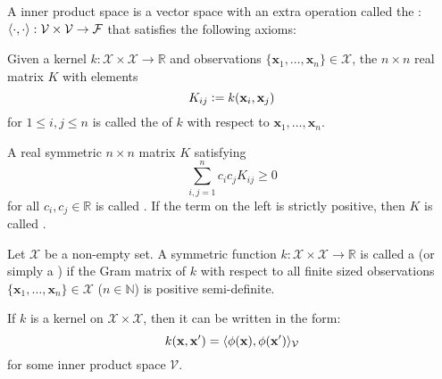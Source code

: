 \begin{definition}
A inner product space is a vector space with an extra operation called the : $\langle\cdot, \cdot\rangle : \mathcal{V} \times \mathcal{V} \to \mathcal{F}$ that satisfies the following axioms:
\end{definition}

\begin{definition}
Given a kernel $k : \mathcal{X} \times \mathcal{X} \to \mathbb{R}$ and observations $\{ \mathbf{x}_1, \dotsc, \mathbf{x}_n \} \in \mathcal{X}$, the $n \times n$ real matrix $K$ with elements
\begin{equation}
	K_{ij} \vcentcolon= k(\mathbf{x}_i, \mathbf{x}_j)
\end{equation}
for $1 \leq i, j \leq n$ is called the  of $k$ with respect to $\mathbf{x}_1, \dotsc, \mathbf{x}_n$.
\end{definition}

\begin{definition}
A real symmetric $n \times n$ matrix $K$ satisfying
\begin{equation}
	\sum_{i, j=1}^n c_i c_j K_{ij} \geq 0
\end{equation}
for all $c_i, c_j \in \mathbb{R}$ is called . If the term on the left is strictly positive, then $K$ is called .
\end{definition}

\begin{definition}
Let $\mathcal{X}$ be a non-empty set. A symmetric function $k : \mathcal{X} \times \mathcal{X} \to \mathbb{R}$ is called a  (or simply a ) if the Gram matrix of $k$ with respect to all finite sized observations $\{ \mathbf{x}_1, \dotsc, \mathbf{x}_n \} \in \mathcal{X}$ ($n \in \mathbb{N}$) is positive semi-definite.
\end{definition}

\begin{theorem}
If $k$ is a kernel on $\mathcal{X} \times \mathcal{X}$, then it can be written in the form:
\begin{equation}
	k(\mathbf{x}, \mathbf{x}^\prime) = \langle\phi(\mathbf{x}),  \phi(\mathbf{x}^\prime)\rangle_\mathcal{V}
\end{equation}
for some inner product space $\mathcal{V}$.
\end{theorem}

